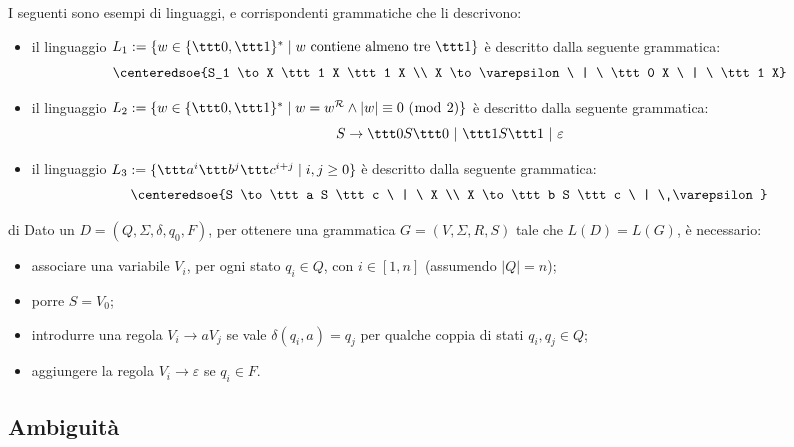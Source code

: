\documentclass[a4paper, 12pt]{report}
\begin{document}
    \begin{example}
        I seguenti sono esempi di linguaggi, e corrispondenti grammatiche che li descrivono:

        \begin{itemize}
            \item il linguaggio $L_1 := \{w \in \{\ttt 0, \ttt 1\}^* \mid w \ \mathrm{contiene \ almeno \ tre \ \ttt 1}\}$ è descritto dalla seguente grammatica: $$\centeredsoe{S_1 \to X \ttt 1 X \ttt 1 X \\ X \to \varepsilon \ | \ \ttt 0 X \ | \ \ttt 1 X}$$
            \item il linguaggio $L_2 := \{w \in \{\ttt 0, \ttt 1\}^* \mid w = w ^\mathcal{R} \land |w| \equiv 0 \ (\bmod \ 2)\}$ è descritto dalla seguente grammatica: $$S \to \ttt 0 S \ttt 0 \ | \ \ttt 1 S \ttt 1 \ | \ \varepsilon$$
            \item il linguaggio $L_3 := \{\ttt a^i \ttt b^j \ttt c^{i + j} \mid i, j \ge 0\}$ è descritto dalla seguente grammatica: $$\centeredsoe{S \to \ttt a S \ttt c \ | \ X \\ X \to \ttt b S \ttt c \ | \ \varepsilon}$$
        \end{itemize}
    \end{example}

    \begin{framedmeth}{\CFG di \DFA}
        Dato un \DFA $D = (Q, \Sigma, \delta, q_0, F)$, per ottenere una grammatica $G = (V, \Sigma, R, S)$ tale che $L(D) = L(G)$, è necessario:

        \begin{itemize}
            \item associare una variabile $V_i$, per ogni stato $q_i \in Q$, con $i \in [1, n]$ (assumendo $|Q| = n$);
            \item porre $S = V_0$;
            \item introdurre una regola $V_i \to a V_j$ se vale $\delta(q_i, a) = q_j$ per qualche coppia di stati $q_i, q_j \in Q$;
            \item aggiungere la regola $V_i \to \varepsilon$ se $q_i \in F$.
        \end{itemize}
    \end{framedmeth}
   
    \subsection{Ambiguità}
\end{document}
